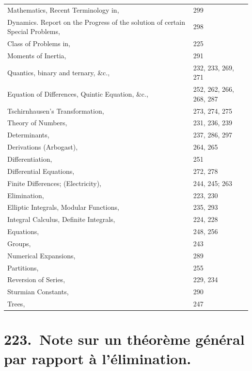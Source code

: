 \documentclass[11pt,a4paper]{book}
\theoremstyle{plain}
\begin{document}
\begin{tabular}{@{}p{2.5in}l@{}}
Mathematics, Recent Terminology in, & 299 \\
Dynamics. Report on the Progress of the solution of certain Special Problems, & 298 \\
\quad Class of Problems in, & 225 \\
\quad Moments of Inertia, & 291 \\
Quantics, binary and ternary, \&c., & 232, 233, 269, 271 \\
Equation of Differences, Quintic Equation, \&c., & 252, 262, 266, 268, 287 \\
Tschirnhausen's Transformation, & 273, 274, 275 \\
Theory of Numbers, & 231, 236, 239 \\
Determinants, & 237, 286, 297 \\
Derivations (Arbogast), & 264, 265 \\
Differentiation, & 251 \\
Differential Equations, & 272, 278 \\
Finite Differences; (Electricity), & 244, 245; 263 \\
Elimination, & 223, 230 \\
Elliptic Integrals, Modular Functions, & 235, 293 \\
Integral Calculus, Definite Integrals, & 224, 228 \\
Equations, & 248, 256 \\
Groups, & 243 \\
Numerical Expansions, & 289 \\
Partitions, & 255 \\
Reversion of Series, & 229, 234 \\
Sturmian Constants, & 290 \\
Trees, & 247 \\
\end{tabular}
\newpage

\mainmatter

\chapter[Note sur un th\'{e}or\`{e}me g\'{e}n\'{e}ral par rapport \`{a} l'\'{e}limination]{223.\ Note sur un th\'{e}or\`{e}me g\'{e}n\'{e}ral par rapport \`{a} l'\'{e}limination.}
\label{paper223}
\end{document}
